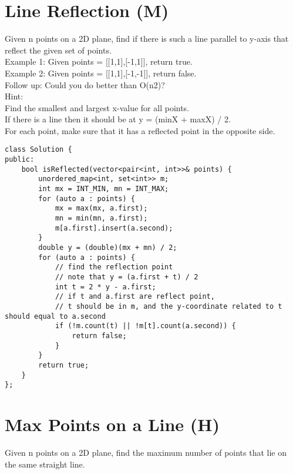 \section{Line Reflection (M)}
Given n points on a 2D plane, find if there is such a line parallel to y-axis that reflect the given set of points.\\

Example 1:
Given points = [[1,1],[-1,1]], return true.\\

Example 2:
Given points = [[1,1],[-1,-1]], return false.\\

Follow up:
Could you do better than O(n2)?\\

Hint:\\
    Find the smallest and largest x-value for all points.\\
    If there is a line then it should be at y = (minX + maxX) / 2.\\
    For each point, make sure that it has a reflected point in the opposite side.\\

\begin{lstlisting}
class Solution {
public:
    bool isReflected(vector<pair<int, int>>& points) {
        unordered_map<int, set<int>> m;
        int mx = INT_MIN, mn = INT_MAX;
        for (auto a : points) {
            mx = max(mx, a.first);
            mn = min(mn, a.first);
            m[a.first].insert(a.second);
        }
        double y = (double)(mx + mn) / 2;
        for (auto a : points) {
            // find the reflection point
            // note that y = (a.first + t) / 2
            int t = 2 * y - a.first;
            // if t and a.first are reflect point, 
            // t should be in m, and the y-coordinate related to t should equal to a.second
            if (!m.count(t) || !m[t].count(a.second)) {
                return false;
            }
        }
        return true;
    }
};
\end{lstlisting}


\section{Max Points on a Line (H)}
Given n points on a 2D plane, find the maximum number of points that lie on the same straight line.\\

